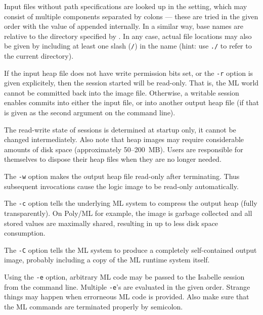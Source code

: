 \begin{isabellebody}
\begin{isamarkuptext}
  Input files without path specifications are looked up in the
  \hyperlink{setting.ISABELLE-PATH}{\mbox{}} setting, which may consist of multiple
  components separated by colons --- these are tried in the given
  order with the value of \hyperlink{setting.ML-IDENTIFIER}{\mbox{}} appended
  internally.  In a similar way, base names are relative to the
  directory specified by \hyperlink{setting.ISABELLE-OUTPUT}{\mbox{}}.  In any case,
  actual file locations may also be given by including at least one
  slash (\verb|/|) in the name (hint: use \verb|./| to
  refer to the current directory).%
\end{isamarkuptext}%
\isamarkuptrue%
%
\isamarkuptrue%
%
\begin{isamarkuptext}%
If the input heap file does not have write permission bits set, or
  the \verb|-r| option is given explicitely, then the session
  started will be read-only.  That is, the ML world cannot be
  committed back into the image file.  Otherwise, a writable session
  enables commits into either the input file, or into another output
  heap file (if that is given as the second argument on the command
  line).

  The read-write state of sessions is determined at startup only, it
  cannot be changed intermediately. Also note that heap images may
  require considerable amounts of disk space (approximately
  50--200~MB). Users are responsible for themselves to dispose their
  heap files when they are no longer needed.

  \medskip The \verb|-w| option makes the output heap file
  read-only after terminating.  Thus subsequent invocations cause the
  logic image to be read-only automatically.

  \medskip The \verb|-c| option tells the underlying ML system
  to compress the output heap (fully transparently).  On Poly/ML for
  example, the image is garbage collected and all stored values are
  maximally shared, resulting in up to  less disk space
  consumption.

  \medskip The \verb|-C| option tells the ML system to produce
  a completely self-contained output image, probably including a copy
  of the ML runtime system itself.

  \medskip Using the \verb|-e| option, arbitrary ML code may be
  passed to the Isabelle session from the command line. Multiple
  \verb|-e|'s are evaluated in the given order. Strange things
  may happen when errorneous ML code is provided. Also make sure that
  the ML commands are terminated properly by semicolon.


\end{isamarkuptext}
\end{isabellebody}
